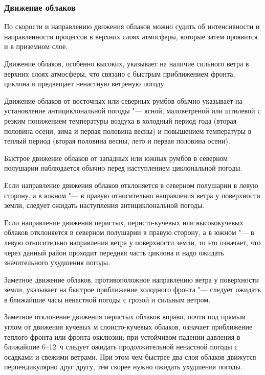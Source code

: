 \subsubsection{Движение облаков}

По скорости и направлению движения облаков можно судить об
интенсивности и направленности процессов в верхних слоях атмосферы,
которые затем проявится и в приземном слое.

 Движение облаков, особенно высоких, указывает на наличие
сильного ветра в верхних слоях атмосферы, что связано с быстрым
приближением фронта, циклона и предвещает ненастную ветреную погоду.

 Движение облаков от восточных или северных румбов обычно
указывает на установление антициклональной погоды "--- ясной,
маловетреной или штилевой с резким понижением температуры воздуха в
холодный период года (вторая половина осени, зима и первая половина
весны) и повышением температуры в теплый период (вторая половина
весны, лето и первая половина осени).

 Быстрое движение облаков от западных или южных румбов в
северном полушарии наблюдается обычно перед наступлением циклональной
погоды.

 Если направление движения облаков отклоняется в северном
полушарии в левую сторону, а в южном "--- в правую относительно направления
ветра у поверхности земли, следует ожидать наступления
антициклональной погоды.

 Если направление движения перистых, перисто-кучевых или
высококучевых облаков отклоняется в северном полушарии в правую
сторону, а в южном "--- в левую относительно направления ветра у
поверхности земли, то это означает, что через данный район проходит
передняя часть циклона и надо ожидать значительного ухудшения погоды.

 Заметное движение облаков, противоположное направлению ветра у
поверхности земли, указывает на быстрое приближение холодного
фронта "--- следует ожидать в ближайшие часы ненастной погоды с грозой и
сильным ветром.

 Заметное отклонение движения перистых облаков вправо, почти под
прямым углом от движения кучевых м слоисто-кучевых облаков, означает
приближение теплого фронта или фронта окклюзии; при устойчивом падении
давления в ближайшие 6--12~ч следует ожидать продолжительной ненастной
погоды с осадками и свежими ветрами. При этом чем быстрее два слоя
облаков движутся перпендикулярно друг другу, тем скорее нужно ожидать
ухудшения погоды.

